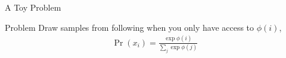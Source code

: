 \begin{frame}{A Toy Problem}
  \begin{alertblock}{Problem}
      Draw samples from following when you only have access to $\phi(i)$,
      \begin{align}
        \Pr(x_i) = \frac{\exp\phi(i)}{\sum_j\exp\phi(j)} \tag{$i \in [k]$}
      \end{align}
  \end{alertblock}
\end{frame}

